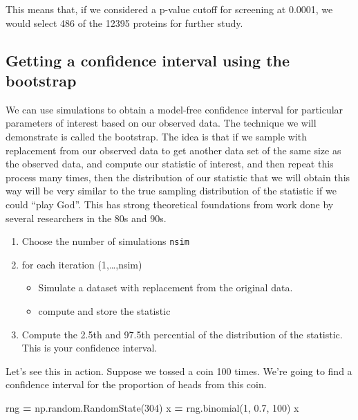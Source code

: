 \documentclass[
  letterpaper,
]{scrbook}
\newenvironment{Shaded}{\begin{snugshade}}{\end{snugshade}}
\newcommand{\DecValTok}[1]{\textcolor[rgb]{0.00,0.00,0.81}{#1}}
\newcommand{\FloatTok}[1]{\textcolor[rgb]{0.00,0.00,0.81}{#1}}
\newcommand{\NormalTok}[1]{#1}
\newcommand{\OperatorTok}[1]{\textcolor[rgb]{0.81,0.36,0.00}{\textbf{#1}}}
\providecommand{\tightlist}{%
  \setlength{\itemsep}{0pt}\setlength{\parskip}{0pt}}
\begin{document}
This means that, if we considered a p-value cutoff for screening at 0.0001, we would select 486 of the 12395 proteins for further study.

\hypertarget{getting-a-confidence-interval-using-the-bootstrap}{%
\subsection{Getting a confidence interval using the bootstrap}\label{getting-a-confidence-interval-using-the-bootstrap}}

We can use simulations to obtain a model-free confidence interval for particular parameters of interest based on our observed data. The technique we will demonstrate is called the bootstrap. The idea is that if we sample with replacement from our observed data to get another data set of the same size as the observed data, and compute our statistic of interest, and then repeat this process many times, then the distribution of our statistic that we will obtain this way will be very similar to the true sampling distribution of the statistic if we could ``play God''. This has strong theoretical foundations from work done by several researchers in the 80s and 90s.

\begin{enumerate}
\def\labelenumi{\arabic{enumi}.}
\tightlist
\item
  Choose the number of simulations \texttt{nsim}
\item
  for each iteration (1,\ldots,nsim)

  \begin{itemize}
  \tightlist
  \item
    Simulate a dataset with replacement from the original data.
  \item
    compute and store the statistic
  \end{itemize}
\item
  Compute the 2.5th and 97.5th percential of the distribution of the statistic. This is your confidence interval.
\end{enumerate}

Let's see this in action. Suppose we tossed a coin 100 times. We're going to find a confidence interval for the proportion of heads from this coin.

\begin{Shaded}
\begin{Highlighting}[]
\NormalTok{rng }\OperatorTok{=}\NormalTok{ np.random.RandomState(}\DecValTok{304}\NormalTok{)}
\NormalTok{x }\OperatorTok{=}\NormalTok{ rng.binomial(}\DecValTok{1}\NormalTok{, }\FloatTok{0.7}\NormalTok{, }\DecValTok{100}\NormalTok{)}
\NormalTok{x}
\end{Highlighting}
\end{Shaded}
\end{document}

